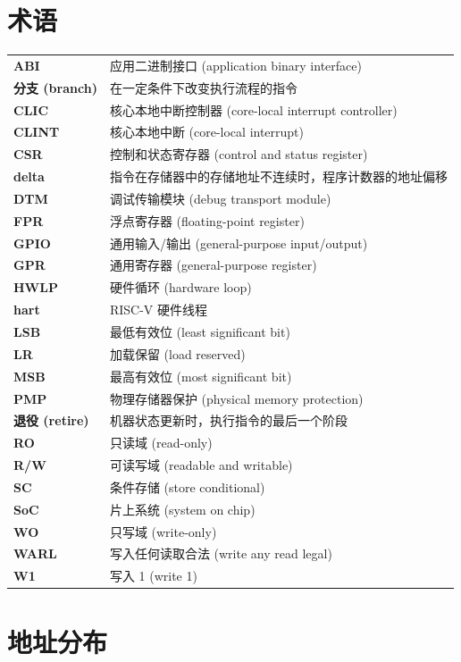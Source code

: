 \documentclass[main\_\_CN.tex]{subfiles}
\begin{document}
\section{术语}
\begin{longtable}[c]{ R{2cm} p{12cm} }
\textbf{ABI} & 应用二进制接口 (application binary interface)\\
\textbf{分支 (branch)} & 在一定条件下改变执行流程的指令 \\
\textbf{CLIC} & 核心本地中断控制器 (core-local interrupt controller)\\
\textbf{CLINT} & 核心本地中断 (core-local interrupt)\\
\textbf{CSR} & 控制和状态寄存器 (control and status register)\\
\textbf{delta} & 指令在存储器中的存储地址不连续时，程序计数器的地址偏移 \\
\textbf{DTM} & 调试传输模块 (debug transport module) \\
\textbf{FPR} & 浮点寄存器 (floating-point register)\\
\textbf{GPIO} & 通用输入/输出 (general-purpose input/output)\\
\textbf{GPR} & 通用寄存器 (general-purpose register)\\
\textbf{HWLP} & 硬件循环 (hardware loop)\\
\textbf{hart} & RISC-V 硬件线程\\
\textbf{LSB} & 最低有效位 (least significant bit)\\
\textbf{LR} & 加载保留 (load reserved)\\
\textbf{MSB} & 最高有效位 (most significant bit)\\
\textbf{PMP} & 物理存储器保护 (physical memory protection)\\
\textbf{退役 (retire)} & 机器状态更新时，执行指令的最后一个阶段 \\
\textbf{RO} & 只读域 (read-only)\\
\textbf{R/W} & 可读写域 (readable and writable)\\
\textbf{SC} & 条件存储 (store conditional)\\
\textbf{SoC} & 片上系统 (system on chip)\\
\textbf{WO} & 只写域 (write-only)\\
\textbf{WARL} & 写入任何读取合法 (write any read legal)\\
\textbf{W1} & 写入 1 (write 1)\\
\end{longtable}

\section{地址分布}
\end{document}
